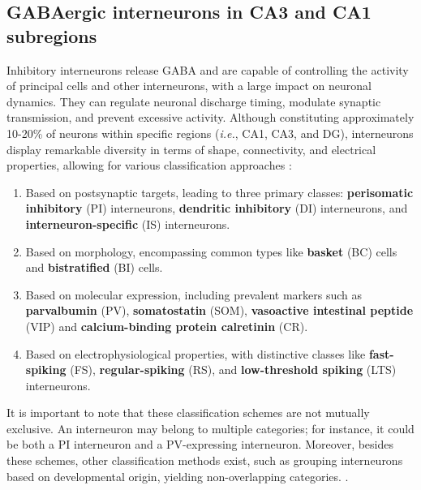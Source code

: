\documentclass[../main.tex]{subfiles}
\begin{document}
\subsection{GABAergic interneurons in CA3 and CA1 subregions}
Inhibitory interneurons release GABA and are capable of controlling the activity of principal cells and other interneurons, with a large impact on neuronal dynamics. They can regulate neuronal discharge timing, modulate synaptic transmission, and prevent excessive activity.
Although constituting approximately 10-20\% of neurons within specific regions (\textit{i.e.}, CA1, CA3, and DG), interneurons display remarkable diversity in terms of shape, connectivity, and electrical properties, allowing for various classification approaches \citep{petilla2008petilla,somogyi2005defined,klausberger_gabaergic_2009,booker_morphological_2018,tzilivaki_hippocampal_2023}:
\begin{enumerate}
\item Based on postsynaptic targets, leading to three primary classes: \textbf{perisomatic inhibitory} (PI) interneurons, \textbf{dendritic inhibitory} (DI) interneurons, and \textbf{interneuron-specific} (IS) interneurons.
\item Based on morphology, encompassing common types like \textbf{basket} (BC) cells and \textbf{bistratified} (BI) cells.
\item Based on molecular expression, including prevalent markers such as \textbf{parvalbumin} (PV), \textbf{somatostatin} (SOM), \textbf{vasoactive intestinal peptide} (VIP) and \textbf{calcium-binding protein calretinin} (CR).
\item Based on electrophysiological properties, with distinctive classes like \textbf{fast-spiking} (FS), \textbf{regular-spiking} (RS), and \textbf{low-threshold spiking} (LTS) interneurons.
\end{enumerate}
It is important to note that these classification schemes are not mutually exclusive.
An interneuron may belong to multiple categories; for instance, it could be both a PI interneuron and a PV-expressing interneuron.
Moreover, besides these schemes, other classification methods exist, such as grouping interneurons based on developmental origin, yielding non-overlapping categories. \citep{rudy2011three,tzilivaki_hippocampal_2023}.
\end{document}
